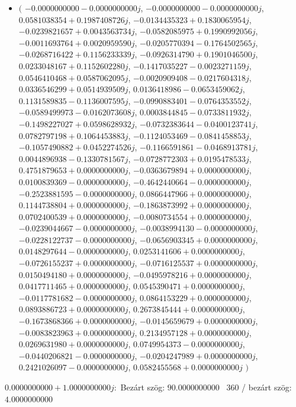 \documentclass[14pt,a4paper]{article}
\begin{document}
\begin{itemize}
\item
$\big($
$-0.0000000000-0.0000000000j$, $-0.0000000000-0.0000000000j$, $0.0581038354+0.1987408726j$, $-0.0134435323+0.1830065954j$, $-0.0239821657+0.0043563734j$, $-0.0582085975+0.1990992056j$, $-0.0011693764+0.0020959590j$, $-0.0205770394-0.1764502565j$, $-0.0268716422+0.1156233339j$, $-0.0926314790+0.1901046500j$, $0.0233048167+0.1152602280j$, $-0.1417035227-0.0023271159j$, $0.0546410468+0.0587062095j$, $-0.0020909408-0.0217604318j$, $0.0336546299+0.0514939509j$, $0.0136418986-0.0653459062j$, $0.1131589835-0.1136007595j$, $-0.0990883401-0.0764353552j$, $-0.0589499973-0.0162073608j$, $0.0003844845-0.0733811932j$, $-0.1498227027+0.0598628932j$, $-0.0732383644-0.0400123741j$, $0.0782797198+0.1064453883j$, $-0.1124053469-0.0841458853j$, $-0.1057490882+0.0452274526j$, $-0.1166591861-0.0468913781j$, $0.0044896938-0.1330781567j$, $-0.0728772303+0.0195478533j$, $0.4751879653+0.0000000000j$, $-0.0363679894+0.0000000000j$, $0.0100839369-0.0000000000j$, $-0.4642440664-0.0000000000j$, $-0.2523881595-0.0000000000j$, $0.0866447966+0.0000000000j$, $0.1144738804+0.0000000000j$, $-0.1863873992+0.0000000000j$, $0.0702400539+0.0000000000j$, $-0.0080734554+0.0000000000j$, $-0.0239044667-0.0000000000j$, $-0.0038994130-0.0000000000j$, $-0.0228122737-0.0000000000j$, $-0.0656903345+0.0000000000j$, $0.0148297644-0.0000000000j$, $0.0253141606+0.0000000000j$, $-0.0726155237+0.0000000000j$, $-0.0716125537+0.0000000000j$, $0.0150494180+0.0000000000j$, $-0.0495978216+0.0000000000j$, $0.0417711465+0.0000000000j$, $0.0545390471+0.0000000000j$, $-0.0117781682-0.0000000000j$, $0.0864153229+0.0000000000j$, $0.0893886723+0.0000000000j$, $0.2673845444+0.0000000000j$, $-0.1673868366+0.0000000000j$, $-0.0145659679+0.0000000000j$, $-0.0083823963+0.0000000000j$, $0.2134957128+0.0000000000j$, $0.0269631980+0.0000000000j$, $0.0749954373-0.0000000000j$, $-0.0440206821-0.0000000000j$, $-0.0204247989+0.0000000000j$, $0.2421026097-0.0000000000j$, $0.0582455568+0.0000000000j$
$\big)$
\end{itemize}
$0.0000000000+1.0000000000j$:\
Bezárt szög: $90.0000000000$ \
360 / bezárt szög: $4.0000000000$\
\end{document}

